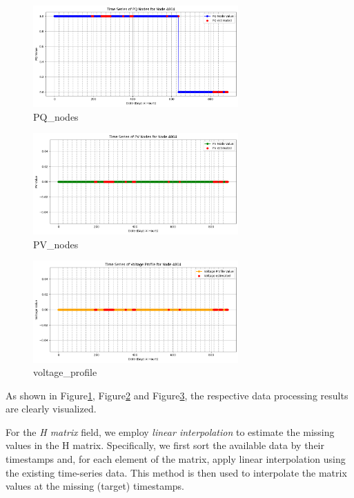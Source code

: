 \documentclass[12pt]{article}
\begin{document}
\begin{figure}[ht]
    \centering
    \includegraphics[width=0.7\textwidth]{picture/PQ_nodes.png}
    \caption{PQ\_nodes}
\label{fig:PQ_nodes}
\end{figure}

\begin{figure}[H]
    \centering
    \includegraphics[width=0.7\textwidth]{picture/PV_nodes.png}
    \caption{PV\_nodes}
\label{fig:PV_nodes}
\end{figure}

\begin{figure}[H]
    \centering
    \includegraphics[width=0.7\textwidth]{picture/voltage_profile.png}
    \caption{voltage\_profile}
\label{fig:voltage_profile}
\end{figure}

As shown in Figure\ref{fig:PQ_nodes}, Figure\ref{fig:PV_nodes} and Figure\ref{fig:voltage_profile}, the respective data processing results are clearly visualized.

For the \emph{H matrix} field, we employ \emph{linear interpolation} to estimate the missing values in the H matrix. Specifically, we first sort the available data by their timestamps and, for each element of the matrix, apply linear interpolation using the existing time-series data. This method is then used to interpolate the matrix values at the missing (target) timestamps.
\end{document}
